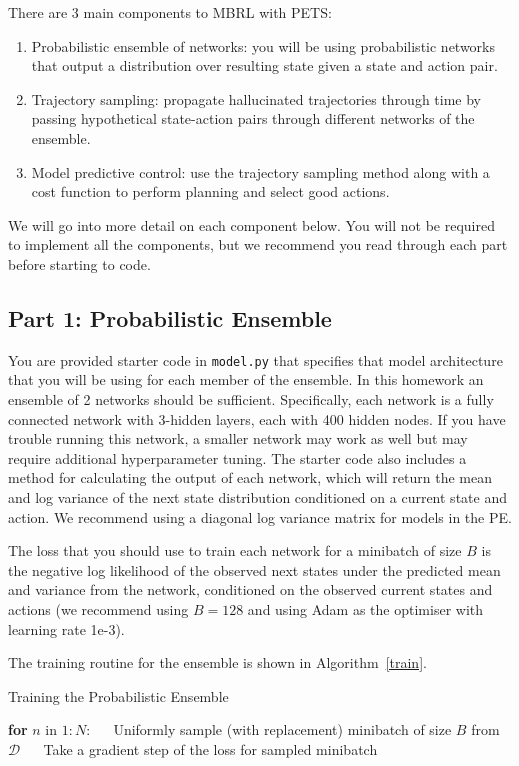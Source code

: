 \documentclass[12pt]{article}
\begin{document}
There are 3 main components to MBRL with PETS: 
\begin{enumerate}
    \item Probabilistic ensemble of networks: you will be using probabilistic networks that output a distribution over resulting state given a state and action pair.  
    \item Trajectory sampling: propagate hallucinated trajectories through time by passing hypothetical state-action pairs through different networks of the ensemble.  
    \item Model predictive control: use the trajectory sampling method along with a cost function to perform planning and select good actions.
\end{enumerate}

We will go into more detail on each component below. You will not be required to implement all the components, but we recommend you read through each part before starting to code.

\subsection*{Part 1: Probabilistic Ensemble}
You are provided starter code in \texttt{model.py} that specifies that model architecture that you will be using for each member of the ensemble. In this homework an ensemble of 2 networks should be sufficient.  Specifically, each network is a fully connected network with 3-hidden layers, each with 400 hidden nodes.  If you have trouble running this network, a smaller network may work as well but may require additional hyperparameter tuning.  The starter code also includes a method for calculating the output of each network, which will return the mean and log variance of the next state distribution conditioned on a current state and action. We recommend using a diagonal log variance matrix for models in the PE.

The loss that you should use to train each network for a minibatch of size $B$ is the negative log likelihood of the observed next states under the predicted mean and variance from the network, conditioned on the observed current states and actions (we recommend using $B=128$ and using Adam as the optimiser with learning rate 1e-3).

The training routine for the ensemble is shown in Algorithm~\ref{train}.
\begin{algorithm}
\label{alga2b}
\caption{Training the Probabilistic Ensemble}\label{train}
\begin{algorithmic}[1]
\State \textbf{for} $n$ in $1:N$: 
\State $\quad$ Uniformly sample (with replacement) minibatch of size $B$ from $\mathcal{D}$
\State $\quad$ Take a gradient step of the loss for sampled minibatch
\EndProcedure
\end{algorithmic}
\end{algorithm}
\end{document}
